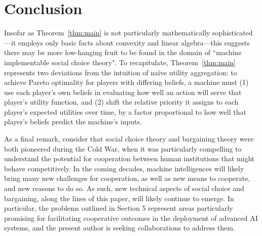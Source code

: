 \documentclass{article}
\newcommand{\thm}[1]{Theorem~\ref{thm:#1}}
\begin{document}
\section{Conclusion}

Insofar as \thm{main} is not particularly mathematically sophisticated---it employs only basic facts about convexity and linear algebra---this suggests there may be more low-hanging fruit to be found in the domain of ``machine implementable social choice theory".  To recapitulate, \thm{main} represents two deviations from the intuition of na\"{i}ve utility aggregation: to achieve Pareto optimality for players with differing beliefs, a machine must (1) use each player's own beliefs in evaluating how well an action will serve that player's utility function, and (2) shift the relative priority it assigns to each player's expected utilities over time, by a factor proportional to how well that player's beliefs predict the machine's inputs.

As a final remark, consider that social choice theory and bargaining theory were both pioneered during the Cold War, when it was particularly compelling to understand the potential for cooperation between human institutions that might behave competitively.  In the coming decades, machine intelligences will likely bring many new challenges for cooperation, as well as new means to cooperate, and new reasons to do so.  As such, new technical aspects of social choice and bargaining, along the lines of this paper, will likely continue to emerge.  In particular, the problems outlined in Section 5 represent areas particularly promising for facilitating cooperative outcomes in the deployment of advanced AI systems, and the present author is seeking collaborations to address them.





\end{document}
